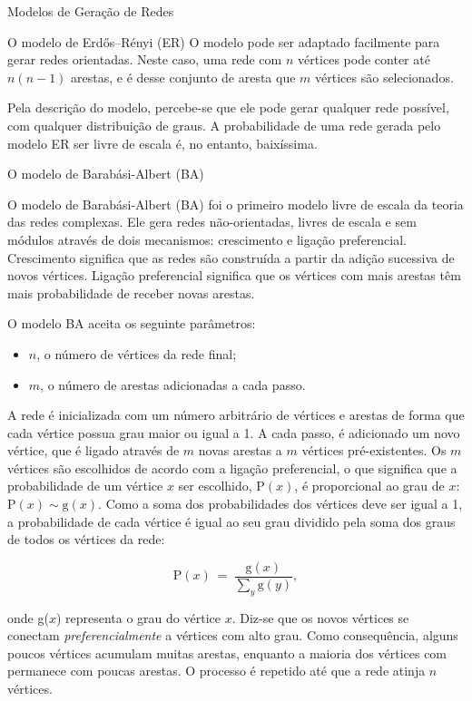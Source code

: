 \begin{section}{Modelos de Geração de Redes}
\begin{subsection}{O modelo de Erdős–Rényi (ER)}
	O modelo pode ser adaptado facilmente para gerar redes orientadas. Neste caso, uma rede com $n$ vértices pode conter até $n(n-1)$ arestas, e é desse conjunto de aresta que $m$ vértices são selecionados.
	
	Pela descrição do modelo, percebe-se que ele pode gerar qualquer rede possível, com qualquer distribuição de graus. A probabilidade de uma rede gerada pelo modelo ER ser livre de escala é, no entanto, baixíssima.

\end{subsection}

\begin{subsection}{O modelo de Barabási-Albert (BA)}	
	
	O modelo de Barabási-Albert (BA) \cite{Barabasi1999} foi o primeiro modelo livre de escala da teoria das redes complexas. Ele gera redes não-orientadas, livres de escala e sem módulos através de dois mecanismos: crescimento e ligação preferencial. Crescimento significa que as redes são construída a partir da adição sucessiva de novos vértices. Ligação preferencial significa que os vértices com mais arestas têm mais probabilidade de receber novas arestas.
	
	O modelo BA aceita os seguinte parâmetros:
	
	\begin{itemize}
		\item $n$, o número de vértices da rede final;
		\item $m$, o número de arestas adicionadas a cada passo.
	\end{itemize}
	
	A rede é inicializada com um número arbitrário de vértices e arestas de forma que cada vértice possua grau maior ou igual a 1. A cada passo, é adicionado um novo vértice, que é ligado através de $m$ novas arestas a $m$ vértices pré-existentes. Os $m$ vértices são escolhidos de acordo com a ligação preferencial, o que significa que a probabilidade de um vértice $x$ ser escolhido, $\mathrm{P}(x)$, é proporcional ao grau de $x$: $\mathrm{P}(x) \sim \mathrm{g}(x)$. Como a soma dos probabilidades dos vértices deve ser igual a 1, a probabilidade de cada vértice é igual ao seu grau dividido pela soma dos graus de todos os vértices da rede:
	
	$$
	\mathrm{P}(x) ~=~ \frac{\mathrm{g}(x)}{\sum_y \mathrm{g}(y)},
	$$
	
	onde g($x$) representa o grau do vértice $x$. Diz-se que os novos vértices se conectam \emph{preferencialmente} a vértices com alto grau. Como consequência, alguns poucos vértices acumulam muitas arestas, enquanto a maioria dos vértices com permanece com poucas arestas. O processo é repetido até que a rede atinja $n$ vértices.
	

\end{subsection}
\end{section}
